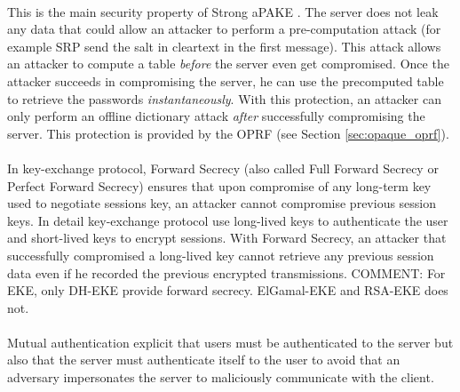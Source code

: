 ﻿\documentclass[../report.tex]{subfiles}
\begin{document}
\paragraph{} \label{sec:secure_against_pca}
This is the main security property of Strong aPAKE \cite{OPAQUE_Paper}. The server does not leak any data that could allow an attacker to perform a pre-computation attack (for example SRP send the salt in cleartext in the first message). This attack allows an attacker to compute a table \emph{before} the server even get compromised. Once the attacker succeeds in compromising the server, he can use the precomputed table to retrieve the passwords \emph{instantaneously}. With this protection, an attacker can only perform an offline dictionary attack \emph{after} successfully compromising the server.
This protection is provided by the OPRF (see Section \ref{sec:opaque_oprf}).
\paragraph{}
In key-exchange protocol, Forward Secrecy (also called Full Forward Secrecy or Perfect Forward Secrecy) ensures that upon compromise of any long-term key used to negotiate sessions key, an attacker cannot compromise previous session keys.
In detail key-exchange protocol use long-lived keys to authenticate the user and short-lived keys to encrypt sessions. With Forward Secrecy, an attacker that successfully compromised a long-lived key cannot retrieve any previous session data even if he recorded the previous encrypted transmissions. %
COMMENT: For EKE, only DH-EKE provide forward secrecy. ElGamal-EKE and RSA-EKE does not.
\paragraph{}
Mutual authentication explicit that users must be authenticated to the server but also that the server must authenticate itself to the user to avoid that an adversary impersonates the server to maliciously communicate with the client.
\end{document}
